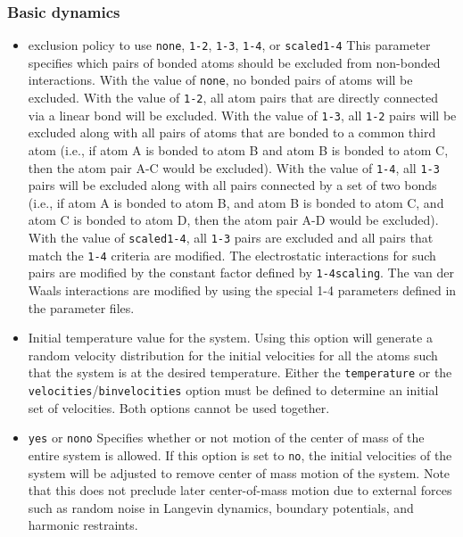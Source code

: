 \subsubsection{Basic dynamics}

\begin{itemize}
\item
{}
{exclusion policy to use}
{{\tt none}, {\tt 1-2}, {\tt 1-3}, {\tt 1-4}, or {\tt scaled1-4}}
{\label{param:exclude}
This parameter specifies which pairs of bonded atoms should
be excluded from non-bonded
interactions.  With the value of {\tt none}, no bonded pairs of atoms 
will be excluded.  With the value of {\tt 1-2}, all atom pairs that
are directly connected via a linear bond will be excluded.  With the
value of {\tt 1-3}, all {\tt 1-2} pairs will be excluded along with
all pairs of atoms that are bonded to a common
third atom (i.e., if atom A is bonded to atom B and atom B is bonded
to atom C, then the atom pair A-C would be excluded).
With the value of {\tt 1-4}, all {\tt 1-3} pairs will be excluded along
with all pairs connected by a set of two bonds (i.e., if atom A is bonded
to atom B, and atom B is bonded to atom C, and atom C is bonded to
atom D, then the atom pair A-D would be excluded).  With the value
of {\tt scaled1-4}, all {\tt 1-3} pairs are excluded and all pairs
that match the {\tt 1-4} criteria are modified.  The electrostatic
interactions for such pairs are modified by the constant factor
defined by {\tt 1-4scaling}.  
The van der Waals interactions are modified
by using the special 1-4 parameters defined in the parameter files.}

\item
{}
{\label{param:temperature}
Initial temperature value for the system.  
Using this option will generate a random
velocity distribution for the initial velocities 
for all the atoms such that the system 
is at the desired temperature.  
Either the {\tt temperature} 
or the {\tt velocities}/{\tt binvelocities}
option must be defined to determine an initial set of velocities.  
Both options cannot be used together.}

\item
{}
{{\tt yes} or {\tt no}}{{\tt no}}
{
Specifies whether or not motion of 
the center of mass of the entire system is allowed.  
If this option is set to {\tt no}, the initial velocities of the system 
will be adjusted to remove center of mass motion of the system.
Note that this does not preclude later center-of-mass motion due to 
external forces such as random noise in Langevin dynamics, boundary
potentials, and harmonic restraints.}


\end{itemize}
